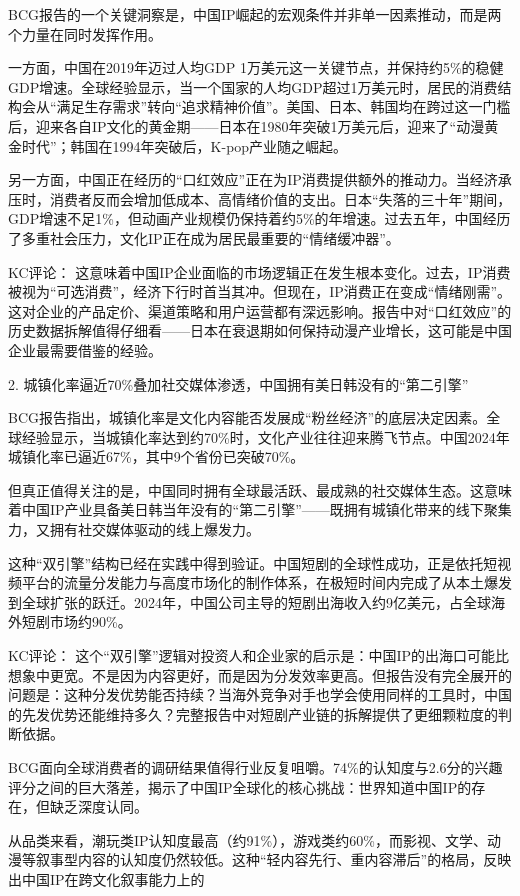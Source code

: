 \documentclass[11pt]{ctexart}
\begin{document}
BCG报告的一个关键洞察是，中国IP崛起的宏观条件并非单一因素推动，而是两个力量在同时发挥作用。

一方面，中国在2019年迈过人均GDP 1万美元这一关键节点，并保持约5\%的稳健GDP增速。全球经验显示，当一个国家的人均GDP超过1万美元时，居民的消费结构会从“满足生存需求”转向“追求精神价值”。美国、日本、韩国均在跨过这一门槛后，迎来各自IP文化的黄金期——日本在1980年突破1万美元后，迎来了“动漫黄金时代”；韩国在1994年突破后，K-pop产业随之崛起。

另一方面，中国正在经历的“口红效应”正在为IP消费提供额外的推动力。当经济承压时，消费者反而会增加低成本、高情绪价值的支出。日本“失落的三十年”期间，GDP增速不足1\%，但动画产业规模仍保持着约5\%的年增速。过去五年，中国经历了多重社会压力，文化IP正在成为居民最重要的“情绪缓冲器”。

KC评论： 这意味着中国IP企业面临的市场逻辑正在发生根本变化。过去，IP消费被视为“可选消费”，经济下行时首当其冲。但现在，IP消费正在变成“情绪刚需”。这对企业的产品定价、渠道策略和用户运营都有深远影响。报告中对“口红效应”的历史数据拆解值得仔细看——日本在衰退期如何保持动漫产业增长，这可能是中国企业最需要借鉴的经验。

2. 城镇化率逼近70\%叠加社交媒体渗透，中国拥有美日韩没有的“第二引擎”

BCG报告指出，城镇化率是文化内容能否发展成“粉丝经济”的底层决定因素。全球经验显示，当城镇化率达到约70\%时，文化产业往往迎来腾飞节点。中国2024年城镇化率已逼近67\%，其中9个省份已突破70\%。

但真正值得关注的是，中国同时拥有全球最活跃、最成熟的社交媒体生态。这意味着中国IP产业具备美日韩当年没有的“第二引擎”——既拥有城镇化带来的线下聚集力，又拥有社交媒体驱动的线上爆发力。

这种“双引擎”结构已经在实践中得到验证。中国短剧的全球性成功，正是依托短视频平台的流量分发能力与高度市场化的制作体系，在极短时间内完成了从本土爆发到全球扩张的跃迁。2024年，中国公司主导的短剧出海收入约9亿美元，占全球海外短剧市场约90\%。

KC评论： 这个“双引擎”逻辑对投资人和企业家的启示是：中国IP的出海口可能比想象中更宽。不是因为内容更好，而是因为分发效率更高。但报告没有完全展开的问题是：这种分发优势能否持续？当海外竞争对手也学会使用同样的工具时，中国的先发优势还能维持多久？完整报告中对短剧产业链的拆解提供了更细颗粒度的判断依据。

BCG面向全球消费者的调研结果值得行业反复咀嚼。74\%的认知度与2.6分的兴趣评分之间的巨大落差，揭示了中国IP全球化的核心挑战：世界知道中国IP的存在，但缺乏深度认同。

从品类来看，潮玩类IP认知度最高（约91\%），游戏类约60\%，而影视、文学、动漫等叙事型内容的认知度仍然较低。这种“轻内容先行、重内容滞后”的格局，反映出中国IP在跨文化叙事能力上的
\end{document}

